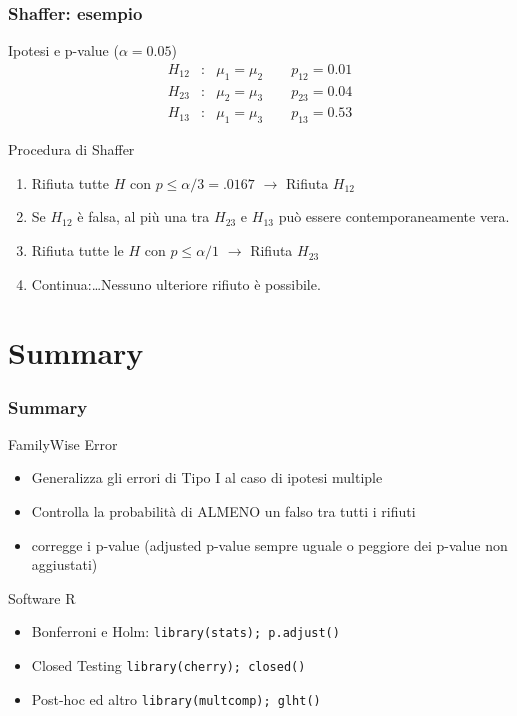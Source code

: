 \documentclass[xcolor={pdftex,dvipsnames,table}]{beamer}
\newcommand{\bb}[1]{\begin{block}{#1}}
\newcommand{\eb}{\end{block}}
\newcommand{\bi}{\begin {itemize}}
\newcommand{\ei}{\end{itemize}}
\newcommand{\be}{\begin {enumerate}}
\newcommand{\ee}{\end{enumerate}}
\newcommand{\bfr}[1]{\begin{frame} \frametitle{#1}}
\begin{document}
\bfr{Shaffer: esempio}
 \bb{Ipotesi e p-value ($\alpha=0.05$)}
   \begin{eqnarray*}
     H_{12}&:& \mu_1=\mu_2 \qquad p_{12} = 0.01\\
     H_{23}&:& \mu_2=\mu_3 \qquad p_{23} = 0.04\\
     H_{13}&:& \mu_1=\mu_3 \qquad p_{13} = 0.53
   \end{eqnarray*}
 \eb
 \bb{Procedura di Shaffer}
   \be
     \item Rifiuta tutte $H$ con  $p\leq \alpha/3=.0167$ $\to$ Rifiuta $H_{12}$
     \item Se $H_{12}$ \`e falsa, al pi\`u una tra $H_{23}$ e $H_{13}$ pu\`o essere contemporaneamente vera.
     \item Rifiuta tutte le $H$ con $p\leq \alpha/1$  $\to$ Rifiuta $H_{23}$
     \item Continua:\ldots Nessuno ulteriore rifiuto \`e  possibile.
   \ee
 \eb
\end{frame}


\section{Summary}

\bfr{Summary}
  \bb{FamilyWise Error}
    \bi
      \item Generalizza gli errori di Tipo I al caso di ipotesi multiple 
\pause
      \item Controlla la probabilit\`a di ALMENO un falso tra tutti i rifiuti
\pause
      \item corregge i p-value (adjusted p-value sempre uguale o peggiore dei p-value non aggiustati)
    \ei
  \eb
\pause
  \bb{Software R}
    \bi
      \item Bonferroni e Holm: {\tt library(stats); p.adjust()}
  \item Closed Testing {\tt library(cherry); closed()}
    \item Post-hoc ed altro {\tt library(multcomp); glht()}
    \ei
  \eb
\end{frame}
\end{document}
